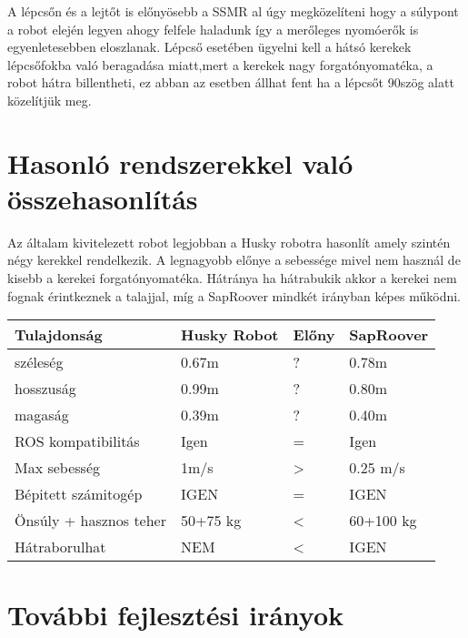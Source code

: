 A lépcsőn és a lejtőt is előnyösebb a SSMR al úgy megközelíteni hogy a súlypont a robot elején legyen ahogy felfele haladunk így a merőleges nyomóerők is egyenletesebben eloszlanak. Lépcső esetében ügyelni kell a hátsó kerekek lépcsőfokba való beragadása miatt,mert a kerekek nagy forgatónyomatéka, a robot hátra billentheti, ez abban az esetben állhat fent ha a lépcsőt 90\degree szög alatt közelítjük meg.


\section{Hasonló rendszerekkel való összehasonlítás}

Az általam kivitelezett robot legjobban a Husky robotra hasonlít amely szintén négy kerekkel rendelkezik. A legnagyobb előnye a sebessége mivel nem használ de kisebb a kerekei forgatónyomatéka. Hátránya ha hátrabukik akkor a kerekei nem fognak érintkeznek a talajjal, míg a SapRoover mindkét irányban képes működni.

\begin{table}[]
\begin{center}
\begin{tabular}{llll}
\hline Tulajdonság & Husky Robot & Előny & SapRoover \\ \hline
 széleség           &    0.67m    &    ?        &   0.78m        \\
   hosszuság        &    0.99m    &   ?        &   0.80m       \\
  magaság           &    0.39m    &   ?        &   0.40m        \\
 ROS 
 kompatibilitás           &    Igen         &   =    &   Igen        \\
   Max sebesség        &    1m/s  &     >   & 0.25 m/s    \\
   Bépitett számitogép        &    IGEN  &   =    & IGEN      \\
   Önsúly + hasznos teher & 50+75 kg &  <   & 60+100 kg \\
   Hátraborulhat & NEM &  <   & IGEN \\
\end{tabular}
\end{center}
\end{table}


\section{További fejlesztési irányok}

